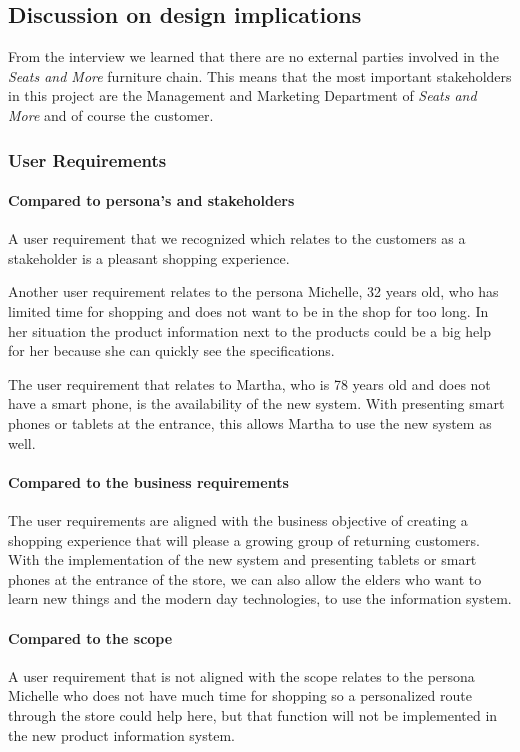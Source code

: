 \documentclass[a4paper]{article}
\begin{document}
\subsection{Discussion on design implications}
From the interview we learned that there are no external parties involved in the \textit{Seats and More} furniture chain. This means that the most important stakeholders in this project are the Management and Marketing Department of \textit{Seats and More} and of course the customer.

\subsubsection*{User Requirements}

\paragraph*{Compared to persona's and stakeholders}
A user requirement that we recognized which relates to the customers as a stakeholder is a pleasant shopping experience. 

Another user requirement relates to the persona Michelle, 32 years old, who has limited time for shopping and does not want to be in the shop for too long. In her situation the product information next to the products could be a big help for her because she can quickly see the specifications. 

The user requirement that relates to Martha, who is 78 years old and does not have a smart phone, is the availability of the new system. With presenting smart phones or tablets at the entrance, this allows Martha to use the new system as well.

\paragraph{Compared to the business requirements}
The user requirements are aligned with the business objective of creating a shopping experience that will please a growing group of returning customers. With the implementation of the new system and presenting tablets or smart phones at the entrance of the store, we can also allow the elders who want to learn new things and the modern day technologies, to use the information system.

\paragraph{Compared to the scope}
A user requirement that is not aligned with the scope relates to the persona Michelle who does not have much time for shopping so a personalized route through the store could help here, but that function will not be implemented in the new product information system.
\end{document}

